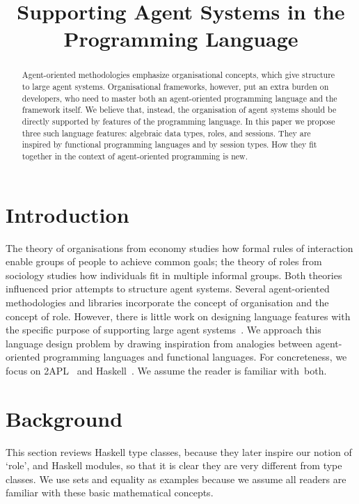 \documentclass[conference,compsoc]{IEEEtran} %
\title{Supporting Agent Systems in the Programming Language}
\author{
  \IEEEauthorblockN{Claudia Grigore and Rem Collier} 
  \IEEEauthorblockA{
    School of Computer Science and Informatics\\
    University College Dublin\\
    Belfield Campus, Dublin~4, Ireland\\
    Email: claudia.grigore@ucdconnect.ie, rem.collier@ucd.ie}}
\begin{document}
\maketitle
\begin{abstract} %

Agent-oriented methodologies emphasize organisational concepts, which give
structure to large agent systems. Organisational frameworks, however, put
an extra burden on developers, who need to master both an agent-oriented
programming language and the framework itself. We believe that, instead,
the organisation of agent systems should be directly supported by features
of the programming language. In this paper we propose three such language
features: algebraic data types, roles, and sessions.  They are inspired by
functional programming languages and by session types.  How they fit
together in the context of agent-oriented programming is new.

\end{abstract} %
\section{Introduction} %

The theory of organisations from economy studies how formal rules of
interaction enable groups of people to achieve common goals; the theory of
roles from sociology studies how individuals fit in multiple informal
groups. Both theories influenced prior attempts to structure agent systems.
Several agent-oriented methodologies and libraries incorporate the concept
of organisation and the concept of role.  However, there is little work on
designing language features with the specific purpose of supporting large
agent systems~\cite{collier2005,DBLP:journals/entcs/BaldoniBT06}. We
approach this language design problem by drawing inspiration from analogies
between agent-oriented programming languages and functional languages. For
concreteness, we focus on 2APL~\cite{DBLP:journals/aamas/Dastani08} and
Haskell~\cite{web:haskell}.  We assume the reader is familiar with~both.

\section{Background} %

This section reviews Haskell type classes, because they later inspire our
notion of `role', and Haskell modules, so that it is clear they are very
different from type classes. We use sets and equality as examples because
we assume all readers are familiar with these basic mathematical concepts.
\end{document}
